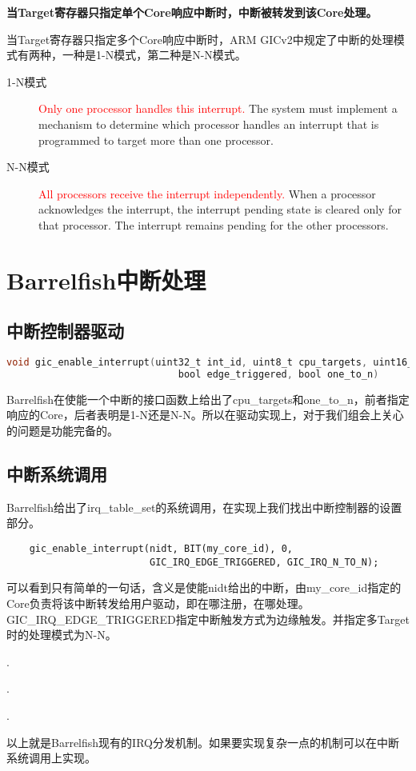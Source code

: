 \documentclass[a4paper, 12pt]{report}
\begin{document}
    \textbf{当Target寄存器只指定单个Core响应中断时，中断被转发到该Core处理。}
    
    当Target寄存器只指定多个Core响应中断时，ARM GICv2中规定了中断的处理模式有两种，一种是1-N模式，第二种是N-N模式。
    
    \begin{description}
        \item[1-N模式] \textcolor{red}{Only one processor handles this interrupt.} The system must implement a mechanism to determine which processor handles an interrupt that is programmed to target more than one processor.
        \item[N-N模式] \textcolor{red}{All processors receive the interrupt independently.} When a processor acknowledges the interrupt, the interrupt pending state is cleared only for that processor. The interrupt remains pending for the other processors.
    \end{description}
    
    \section{Barrelfish中断处理}
    
    \subsection{中断控制器驱动}
    
    \begin{lstlisting}[language=C]
    void gic_enable_interrupt(uint32_t int_id, uint8_t cpu_targets, uint16_t prio,
                              bool edge_triggered, bool one_to_n)
    \end{lstlisting}
    
    Barrelfish在使能一个中断的接口函数上给出了cpu\_targets和one\_to\_n，前者指定响应的Core，后者表明是1-N还是N-N。所以在驱动实现上，对于我们组会上关心的问题是功能完备的。
    
    \subsection{中断系统调用}
   
    Barrelfish给出了irq\_table\_set的系统调用，在实现上我们找出中断控制器的设置部分。
    \begin{lstlisting}
    gic_enable_interrupt(nidt, BIT(my_core_id), 0,
                         GIC_IRQ_EDGE_TRIGGERED, GIC_IRQ_N_TO_N);
    \end{lstlisting}
    可以看到只有简单的一句话，含义是使能nidt给出的中断，由my\_core\_id指定的Core负责将该中断转发给用户驱动，即在哪注册，在哪处理。GIC\_IRQ\_EDGE\_TRIGGERED指定中断触发方式为边缘触发。并指定多Target时的处理模式为N-N。
    
    .
    
    .
    
    .
         
    以上就是Barrelfish现有的IRQ分发机制。如果要实现复杂一点的机制可以在中断系统调用上实现。
    
    
\end{document}
